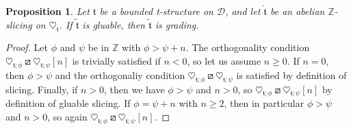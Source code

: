 \documentclass{article}
\newtheorem{prop}[thm]{Proposition}
\newtheorem{lem}[thm]{Lemma}
\theoremstyle{definition}
\newcommand{\Z}{\mathbb{Z}}
\newcommand{\tee}{\mathfrak{t}}
\newcommand{\orth}{\boxslash}
\begin{document}
\begin{prop}\label{glue-to-grad}
Let $\mathfrak{t}$ be a bounded t-structure on $\mathscr{D}$, and let $\hat{\tee}$ be an abelian $\mathbb{Z}$-slicing on $\heartsuit_{\mathfrak{t}}$. If $\tilde{\tee}$ is gluable, then $\tilde{\tee}$ is grading.
\end{prop}
\begin{proof}
Let $\phi$ and $\psi$ be in $\Z$ with $\phi>\psi+n$.
The orthogonality condition $\heartsuit_{\tee;\phi}\orth\heartsuit_{\tee;\psi}[n]$ is trivially satisfied if $n<0$, so let us assume $n\geq 0$. If $n=0$, then $\phi>\psi$ and the orthogonaliy condition $\heartsuit_{\tee;\phi}\orth\heartsuit_{\tee;\psi}$ is satisfied by definition of slicing. Finally, if $n>0$, then we have $\phi>\psi$ and $n>0$, so $\heartsuit_{\tee;\phi}\orth\heartsuit_{\tee;\psi}[n]$ by definition of gluable slicing. %
If $\phi=\psi+n$ with $n\geq 2$, then in particular $\phi>\psi$ and $n>0$, so again $\heartsuit_{\tee;\phi}\orth\heartsuit_{\tee;\psi}[n]$. 
\end{proof}

\end{document}
